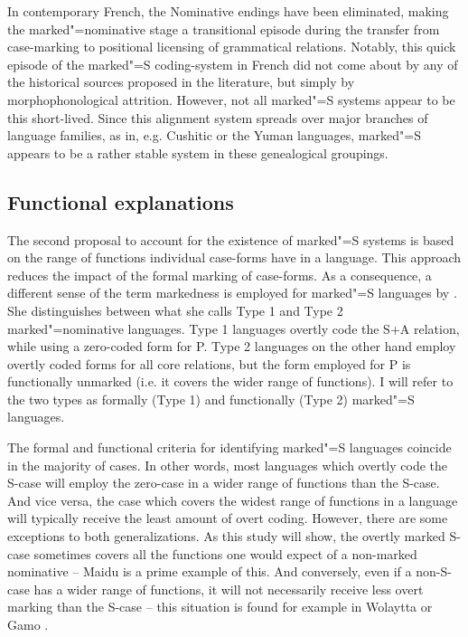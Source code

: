 In contemporary French, the Nominative endings have been eliminated, making the marked"=nominative stage a transitional episode during the transfer from case-marking to positional licensing of grammatical relations. 
Notably, this quick episode of the marked"=S coding-system in French did not come about by any of the historical sources proposed in the literature, but simply by morphophonological attrition.  
However, not all marked"=S systems appear to be this short-lived. 
Since this alignment system spreads over major branches of language families, as in, e.g. Cushitic or the Yuman languages, marked"=S appears to be a rather stable system in these genealogical groupings.

\subsection{Functional explanations}\label{functional} 

The second proposal to account for the existence of marked"=S systems is based on the range of functions individual case-forms have in a language.
This approach reduces the impact of the formal marking of case-forms. As a consequence, a different sense of the term markedness is employed for marked"=S languages by \citet{Koenig:2006,Koenig:2008}. 
She distinguishes between what she calls Type 1 and Type 2 marked"=nominative languages. 
Type 1 languages overtly code the S+A relation, while using a zero-coded form for P. 
Type 2 languages on the other hand employ overtly coded forms for all core relations, but the form employed for P is functionally unmarked (i.e. it covers the wider range of functions). 
I will refer to the two types as formally (Type 1) and functionally (Type 2) marked"=S languages.

The formal and functional criteria for identifying marked"=S languages coincide in the majority of cases. 
In other words, most languages which overtly code the S-case will employ the zero-case in a wider range of functions than the S-case. 
And vice versa, the case which covers the widest range of functions in a language will typically receive the least amount of overt coding. 
However, there are some exceptions to both generalizations. 
As this study will show, the overtly marked S-case sometimes covers all the functions one would expect of a non-marked nominative -- Maidu \citep{Shipley:1964} is a prime example of this. 
And conversely, even if a non-S-case has a wider range of functions, it will not necessarily receive less overt marking than the S-case -- this situation is found  for example in Wolaytta \citep{Lamberti:1997} or Gamo \citep{Hompo:1990}. 

